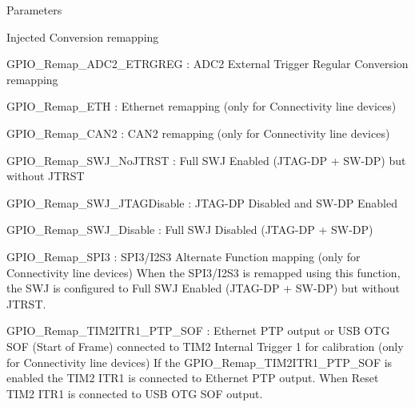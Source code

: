 \begin{DoxyParams}{Parameters}
\begin{DoxyItemize}
Injected Conversion remapping \item G\+P\+I\+O\+\_\+\+Remap\+\_\+\+A\+D\+C2\+\_\+\+E\+T\+R\+G\+R\+EG \+: A\+D\+C2 External Trigger Regular Conversion remapping \item G\+P\+I\+O\+\_\+\+Remap\+\_\+\+E\+TH \+: Ethernet remapping (only for Connectivity line devices) \item G\+P\+I\+O\+\_\+\+Remap\+\_\+\+C\+A\+N2 \+: C\+A\+N2 remapping (only for Connectivity line devices) \item G\+P\+I\+O\+\_\+\+Remap\+\_\+\+S\+W\+J\+\_\+\+No\+J\+T\+R\+ST \+: Full S\+WJ Enabled (J\+T\+A\+G-\/\+DP + S\+W-\/\+DP) but without J\+T\+R\+ST \item G\+P\+I\+O\+\_\+\+Remap\+\_\+\+S\+W\+J\+\_\+\+J\+T\+A\+G\+Disable \+: J\+T\+A\+G-\/\+DP Disabled and S\+W-\/\+DP Enabled \item G\+P\+I\+O\+\_\+\+Remap\+\_\+\+S\+W\+J\+\_\+\+Disable \+: Full S\+WJ Disabled (J\+T\+A\+G-\/\+DP + S\+W-\/\+DP) \item G\+P\+I\+O\+\_\+\+Remap\+\_\+\+S\+P\+I3 \+: S\+P\+I3/\+I2\+S3 Alternate Function mapping (only for Connectivity line devices) When the S\+P\+I3/\+I2\+S3 is remapped using this function, the S\+WJ is configured to Full S\+WJ Enabled (J\+T\+A\+G-\/\+DP + S\+W-\/\+DP) but without J\+T\+R\+ST.\end{DoxyItemize}
\begin{DoxyItemize}
\item G\+P\+I\+O\+\_\+\+Remap\+\_\+\+T\+I\+M2\+I\+T\+R1\+\_\+\+P\+T\+P\+\_\+\+S\+OF \+: Ethernet P\+TP output or U\+SB O\+TG S\+OF (Start of Frame) connected to T\+I\+M2 Internal Trigger 1 for calibration (only for Connectivity line devices) If the G\+P\+I\+O\+\_\+\+Remap\+\_\+\+T\+I\+M2\+I\+T\+R1\+\_\+\+P\+T\+P\+\_\+\+S\+OF is enabled the T\+I\+M2 I\+T\+R1 is connected to Ethernet P\+TP output. When Reset T\+I\+M2 I\+T\+R1 is connected to U\+SB O\+TG S\+OF output.\end{DoxyItemize}
\begin{DoxyItemize}

\end{DoxyItemize}
\end{DoxyParams}
